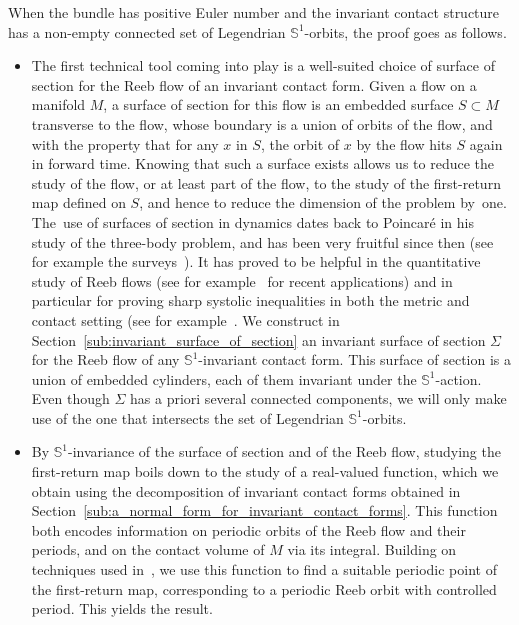\documentclass[AHL,Unicode,longabstracts]{cedram}
\newcommand{\bbS}{\mathbb{S}}
\newcommand{\bbS}{\mathbb{S}}
\begin{document}
When the bundle has positive Euler number and the invariant contact structure has a non-empty connected set of Legendrian $\bbS^1$-orbits, the proof goes as follows.
\begin{itemize}
\item The first technical tool coming into play is a well-suited choice of surface of section for the Reeb flow of an invariant contact form. Given a flow on a manifold $M$, a surface of section for this flow is an embedded surface $S \subset M$ transverse to the flow, whose boundary is a union of orbits of the flow, and with the property that for any $x$ in $S$, the orbit of $x$ by the flow hits $S$ again in forward time. Knowing that such a surface exists allows us to reduce the study of the flow, or at least part of the flow, to the study of the first-return map defined on $S$, and hence to reduce the dimension of the problem by~one. The~use of surfaces of section in dynamics dates back to Poincaré in his study of the three-body problem, and has been very fruitful since then (see for example the surveys~\cite{Ghys_2009,SALOMAO_HRYNIEWICZ_2019}). It has proved to be helpful in the quantitative study of Reeb flows (see for example~\cite{Abbondandolo2023,Albach2021,
Albers2023,
Chaidez2022,
colin2022generic,
Contreras2022,
contreras2022surfaces,edtmair2022disklike,
Moreno_van_Koert_2022} for recent applications) and in particular for proving sharp systolic inequalities in both the metric and contact setting (see for example~\cite{Abbondandolo2017,Abbondandolo2018,ABHS_revol,
Asselle2021,benedetti_kang_2020,Saglam_2021}. We construct in Section~\ref{sub:invariant_surface_of_section} an invariant surface of section $\Sigma$ for the Reeb flow of any $\bbS^1$-invariant contact form. This surface of section is a union of embedded cylinders, each of them invariant under the $\bbS^1$-action. Even though
$\Sigma$ has a priori several connected components, we will only make use of the one that intersects the set of Legendrian $\bbS^1$-orbits.

\item By $\bbS^1$-invariance of the surface of section and of the Reeb flow, studying the first-return map boils down to the study of a real-valued function, which we obtain using the decomposition of invariant contact forms obtained in Section~\ref{sub:a_normal_form_for_invariant_contact_forms}. This function both encodes information on periodic orbits of the Reeb flow and their periods, and on the contact volume of $M$ via its integral. Building on techniques used in~\cite{ABHS_revol}, we use this function to find a suitable periodic point of the first-return map, corresponding to a periodic Reeb orbit with controlled period. This yields the result.
\end{itemize}
\end{document}
